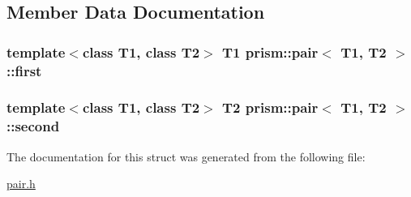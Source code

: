 \subsection{Member Data Documentation}
\subsubsection[{\texorpdfstring{first}{first}}]{\setlength{\rightskip}{0pt plus 5cm}template$<$class T1, class T2$>$ T1 {\bf prism\+::pair}$<$ T1, T2 $>$\+::first}\hypertarget{structprism_1_1pair_a71d9cdb495193c9a7fcca8fdfbedc19d}{}\label{structprism_1_1pair_a71d9cdb495193c9a7fcca8fdfbedc19d}
\subsubsection[{\texorpdfstring{second}{second}}]{\setlength{\rightskip}{0pt plus 5cm}template$<$class T1, class T2$>$ T2 {\bf prism\+::pair}$<$ T1, T2 $>$\+::second}\hypertarget{structprism_1_1pair_a283ff14678f78c074f5f270943727ef3}{}\label{structprism_1_1pair_a283ff14678f78c074f5f270943727ef3}


The documentation for this struct was generated from the following file\+:\begin{DoxyCompactItemize}
\item 
\hyperlink{pair_8h}{pair.\+h}\end{DoxyCompactItemize}
